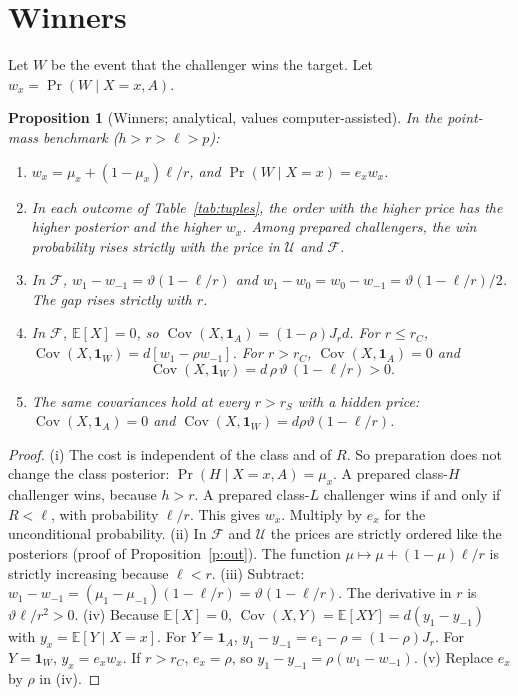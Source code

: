 \documentclass[12pt]{article}
\newtheorem{proposition}{Proposition}
\theoremstyle{definition}
\newcommand{\E}{\mathbb E}
\newcommand{\one}{\mathbf 1}
\DeclareMathOperator{\Cov}{Cov}
\begin{document}
\section{Winners}\label{sec:win}

Let $W$ be the event that the challenger wins the target.
Let $w_x=\Pr(W\mid X=x,A)$.

\begin{proposition}[Winners; analytical, values computer-assisted]\label{p:win}
In the point-mass benchmark ($h>r>\ell>p$):
\begin{enumerate}[label=(\roman*)]
\item $w_x=\mu_x+(1-\mu_x)\ell/r$, and $\Pr(W\mid X=x)=e_xw_x$.
\item In each outcome of Table~\ref{tab:tuples}, the order with the higher price has the higher posterior and the higher $w_x$. Among prepared challengers, the win probability rises strictly with the price in $\mathcal U$ and $\mathcal F$.
\item In $\mathcal F$, $w_1-w_{-1}=\vartheta(1-\ell/r)$ and $w_1-w_0=w_0-w_{-1}=\vartheta(1-\ell/r)/2$. The gap rises strictly with $r$.
\item In $\mathcal F$, $\E[X]=0$, so $\Cov(X,\one_A)=(1-\rho)J_rd$.
For $r\le r_C$, $\Cov(X,\one_W)=d[w_1-\rho w_{-1}]$.
For $r>r_C$, $\Cov(X,\one_A)=0$ and
\[
\Cov(X,\one_W)=d\,\rho\,\vartheta\,(1-\ell/r)>0 .
\]
\item The same covariances hold at every $r>r_S$ with a hidden price: $\Cov(X,\one_A)=0$ and $\Cov(X,\one_W)=d\rho\vartheta(1-\ell/r)$.
\end{enumerate}
\end{proposition}

\begin{proof}
(i) The cost is independent of the class and of $R$.
So preparation does not change the class posterior: $\Pr(H\mid X=x,A)=\mu_x$.
A prepared class-$H$ challenger wins, because $h>r$.
A prepared class-$L$ challenger wins if and only if $R<\ell$, with probability $\ell/r$.
This gives $w_x$.
Multiply by $e_x$ for the unconditional probability.
(ii) In $\mathcal F$ and $\mathcal U$ the prices are strictly ordered like the posteriors (proof of Proposition~\ref{p:out}).
The function $\mu\mapsto\mu+(1-\mu)\ell/r$ is strictly increasing because $\ell<r$.
(iii) Subtract: $w_1-w_{-1}=(\mu_1-\mu_{-1})(1-\ell/r)=\vartheta(1-\ell/r)$.
The derivative in $r$ is $\vartheta\ell/r^2>0$.
(iv) Because $\E[X]=0$, $\Cov(X,Y)=\E[XY]=d(y_1-y_{-1})$ with $y_x=\E[Y\mid X=x]$.
For $Y=\one_A$, $y_1-y_{-1}=e_1-\rho=(1-\rho)J_r$.
For $Y=\one_W$, $y_x=e_xw_x$.
If $r>r_C$, $e_x=\rho$, so $y_1-y_{-1}=\rho(w_1-w_{-1})$.
(v) Replace $e_x$ by $\rho$ in (iv).
\end{proof}
\end{document}
